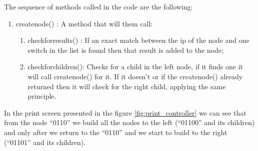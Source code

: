 \documentclass[]{report}
\begin{document}
The sequence of methods called in the code are the following: 
\begin{enumerate}
\item create\textunderscore node() : A method that will them call:
\begin{enumerate}
\item check\textunderscore for\textunderscore results() : If an exact match between the ip of the node and one switch in the list is found then that result is added to the node;
\item check\textunderscore for\textunderscore children(): Checks for a child in the left node, if it finds one it will call create\textunderscore node() for it. If it doesn’t or if the create\textunderscore node() already returned then it will check for the right child, applying the same principle. 
\end{enumerate}
\end{enumerate}

In the print screen presented in the figure \ref{fig:print_controller} we can see that from the node “0110” we build all the nodes to the left (“01100” and its children) and only after we return to the “0110” and we start to build to the right (“01101” and its children).

\begin{minipage}{\linewidth}%

\label{fig:print_controller}
\end{minipage}
\end{document}
